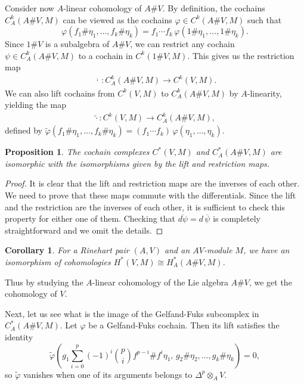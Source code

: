 \documentclass[12pt]{amsart}
\newcommand{\vphi}{{\varphi}}
\newcommand{\hphi}{{\tilde{\varphi}}}
\renewcommand{\sp}{{\#}}
\newtheorem{proposition}[theorem]{Proposition}
\newtheorem{corollary}[theorem]{Corollary}
\theoremstyle{definition}
\begin{document}
Consider now $A$-linear cohomology of $A \sp V$.
By definition, the cochains $C_A^k(A \sp V, M)$ can be viewed as the cochains $\vphi \in C^k(A \sp V, M)$ such that 
\[
\vphi(f_1 \sp \eta_1, \dots, f_k \sp \eta_k) = f_1 \cdots f_k\,\vphi(1\sp\eta_1, \dots, 1\sp\eta_k).
\] 
Since $1 \sp V$ is a subalgebra of $A \sp V$, we can restrict any cochain $\psi \in C_A^k(A \sp V, M)$ to a cochain in $C^k(1 \sp V, M)$. 
This gives us the restriction map
\begin{align*}%
\overline{\,\cdot\,}: C_A^k(A \sp V,M) \rightarrow  C^k(V,M).
\end{align*}
We can also lift cochains from $C^k(V,M)$ to $C_A^k(A \sp V,M)$ by $A$-linearity, yielding the map
\begin{align*}%
\widetilde{\cdot}: C^k(V,M) \rightarrow  C_A^k(A \sp V,M),
\end{align*}
defined by $\hphi(f_1\sp \eta_1, \dots, f_k \sp \eta_k) = (f_1 \cdots f_k) \,\vphi(\eta_1, \dots, \eta_k)$. 

\begin{proposition}
\label{Alinearity}
The cochain complexes  $C^*(V,M)$ and $C_A^*(A \sp V,M)$ are isomorphic with 
the isomorphisms given by the lift and restriction maps.
\end{proposition}
\begin{proof}
It is clear that the lift and restriction maps are the inverses of each other.
We need to prove that these maps commute with the differentials. Since the lift and the restriction are the inverses of each other, it is sufficient to check this property for either one of them. Checking that 
$\overline{d \psi} = d \, \overline{\psi}$ is completely straightforward and we omit the details.
\end{proof}

\begin{corollary}\label{corollary:tildebijective}
For a Rinehart pair $(A, V)$ and an $AV$-module $M$, we have an isomorphism of cohomologies 
$H^*(V, M) \cong H_A^*(A \sp V, M)$.  
\end{corollary}

Thus by studying the $A$-linear cohomology of the Lie algebra $A \sp V$, we get the cohomology of $V$. 

Next, let us see what is the image of the Gelfand-Fuks subcomplex in $C_A^*(A \sp V, M)$. Let $\vphi$ be a Gelfand-Fuks cochain. Then its lift satisfies the identity
\[
\hphi \left( 
 g_1 \sum_{i=0}^p (-1)^i \binom{p}{i} f^{p-i} \# f^i \eta_1, \, g_2 \# \eta_2, \dots, g_k \# \eta_k
\right) = 0,
\]
so $\hphi$ vanishes when one of its arguments belongs to $\Delta^p \otimes_A V$.
\end{document}
